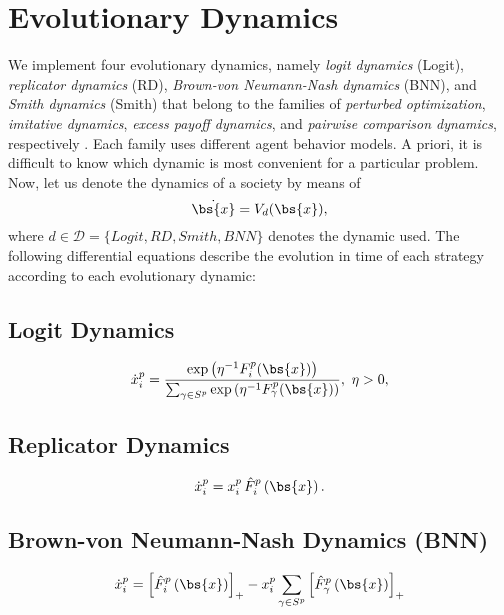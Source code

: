 




\section{Evolutionary Dynamics} \label{sec:dynamics}

We implement four evolutionary dynamics, namely \emph{logit dynamics} (Logit), \emph{replicator dynamics} (RD), \emph{Brown-von Neumann-Nash dynamics} (BNN), and \emph{Smith dynamics} (Smith) that belong to the families of \emph{perturbed optimization}, \emph{imitative dynamics}, \emph{excess payoff dynamics}, and \emph{pairwise comparison dynamics}, respectively \cite{hofbauer2001nash, sandholm_book}. 
%
%
Each family uses different agent behavior models. A priori, it is difficult to know which dynamic is most convenient for a particular problem. 
Now, let us denote the dynamics of a society by means of 
%
\begin{equation}
\dot{ \bs{x} } = V_d( \bs{x} ),
\end{equation}
where $d\in \mathcal{D}=\{ Logit, RD, Smith, BNN \}$ denotes the dynamic used.
The following differential equations describe the evolution in time of each strategy according to each evolutionary dynamic:
%
\subsection{Logit Dynamics}
\begin{equation}\label{eq:logit}
 \dot{x}_i^p = \frac{ \exp\left(\eta^{-1} F_i^p (\bs{x}) \right) }{ \sum_{\gamma \in S^p} \exp\left(\eta^{-1} F_\gamma^p (\bs{x}) \right) }, \, \, \eta>0,
\end{equation}

\subsection{Replicator Dynamics}
\begin{equation}\label{eq:replicator}
\dot{x}_i^p = x_i^p \, \hat{F}_i^p \left( \bs{x} \right).
\end{equation}

\subsection{Brown-von Neumann-Nash Dynamics (BNN)}
\begin{equation}\label{eq:bnn}
 \dot{x}_i^p = \left[ \hat{F}_i^p \left( \bs{x} \right) \right]_+ - x_i^p  \sum_{\gamma \in S^p} \left[ \hat{F}_\gamma^p \left( \bs{x} \right) \right]_+
\end{equation}

